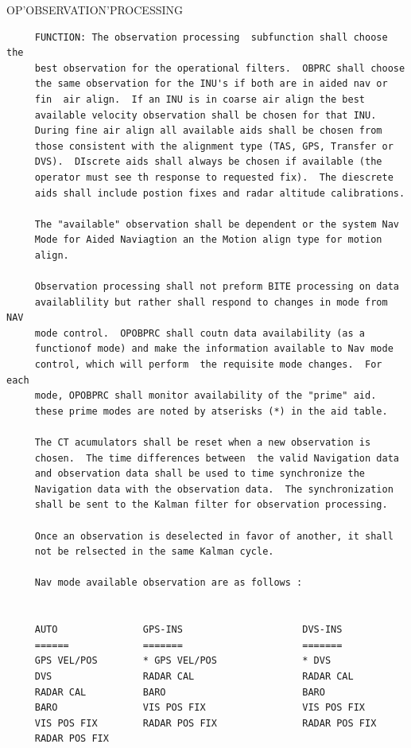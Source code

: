 \begin{frame}
OP'OBSERVATION'PROCESSING
\begin{verbatim}
     FUNCTION: The observation processing  subfunction shall choose the
     best observation for the operational filters.  OBPRC shall choose
     the same observation for the INU's if both are in aided nav or
     fin  air align.  If an INU is in coarse air align the best
     available velocity observation shall be chosen for that INU.
     During fine air align all available aids shall be chosen from
     those consistent with the alignment type (TAS, GPS, Transfer or
     DVS).  DIscrete aids shall always be chosen if available (the
     operator must see th response to requested fix).  The diescrete
     aids shall include postion fixes and radar altitude calibrations.

     The "available" observation shall be dependent or the system Nav
     Mode for Aided Naviagtion an the Motion align type for motion
     align.

     Observation processing shall not preform BITE processing on data
     availablility but rather shall respond to changes in mode from NAV
     mode control.  OPOBPRC shall coutn data availability (as a
     functionof mode) and make the information available to Nav mode
     control, which will perform  the requisite mode changes.  For each
     mode, OPOBPRC shall monitor availability of the "prime" aid.
     these prime modes are noted by atserisks (*) in the aid table.

     The CT acumulators shall be reset when a new observation is
     chosen.  The time differences between  the valid Navigation data
     and observation data shall be used to time synchronize the
     Navigation data with the observation data.  The synchronization
     shall be sent to the Kalman filter for observation processing.

     Once an observation is deselected in favor of another, it shall
     not be relsected in the same Kalman cycle.

     Nav mode available observation are as follows :


     AUTO               GPS-INS                     DVS-INS
     ======             =======                     =======
     GPS VEL/POS        * GPS VEL/POS               * DVS
     DVS                RADAR CAL                   RADAR CAL
     RADAR CAL          BARO                        BARO
     BARO               VIS POS FIX                 VIS POS FIX
     VIS POS FIX        RADAR POS FIX               RADAR POS FIX
     RADAR POS FIX


\end{verbatim}
\end{frame}
